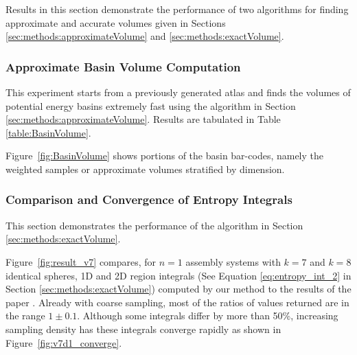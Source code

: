 \documentclass[]{article}
\newcommand{\figref}[1]{Figure~\ref{#1}}
\begin{document}
Results in this section demonstrate the performance of two algorithms
for finding approximate and accurate volumes given in 
Sections \ref{sec:methods:approximateVolume} and
\ref{sec:methods:exactVolume}.
\begin{figure*}[htpb]
\centering
{}
\caption{\scriptsize \textbf{Entropy Calculations}: (a) Convergence of entropy calculation as the step size decreases, 
		for multiple 1D active constraint regions (shown in different colors) in a $n=1$ assembly landscape
with $k=8$ identical spheres. The entropy integral values are scaled by the one with the smallest step size. 
		(b) \scriptsize Comparison of integral values computed by 4 different methods (shown in different colors) on multiple 
		3D active constraint regions for
a $n=1$ assembly landscape with $k=6$ identical spheres. See text in Section \ref{sec:results:ExactVolume}.
}
\end{figure*}
\subsubsection{Approximate Basin Volume Computation}
\label{sec:results:approximateVolume}
This experiment starts from a previously generated atlas
and finds the volumes of potential energy basins
extremely fast using the algorithm in Section \ref{sec:methods:approximateVolume}.
Results are tabulated in Table \ref{table:BasinVolume}. 

\figref{fig:BasinVolume} shows portions of the basin bar-codes, namely
the weighted samples or approximate volumes stratified by dimension.
\subsubsection{Comparison and Convergence of Entropy Integrals} 
\label{sec:results:ExactVolume}

This section demonstrates the performance of the algorithm in Section
\ref{sec:methods:exactVolume}.

\figref{fig:result_v7} compares, for $n=1$ assembly systems with $k=7$ and
$k=8$ identical spheres, 1D and 2D region integrals (See Equation
\eqref{eq:entropy_int_2} in Section \ref{sec:methods:exactVolume}) computed by
our method to the results of the paper \cite{Holmes-Cerfon2013}. Already with
coarse sampling, most of the ratios of values returned are in the range $1\pm
0.1$. Although some integrals differ by more than 50\%, increasing sampling density has
these integrals converge rapidly as shown in \figref{fig:v7d1_converge}.
\end{document}
